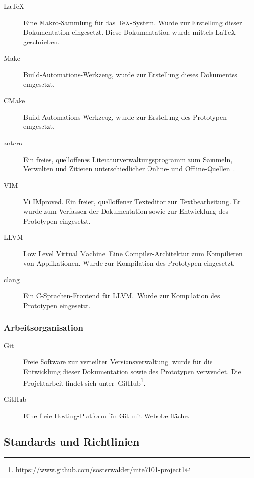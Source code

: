 \begin{description}
    \item[\LaTeX] Eine Makro-Sammlung für das \TeX-System. Wurde zur
        Erstellung dieser Dokumentation eingesetzt. Diese Dokumentation
        wurde mittels \LaTeX{} geschrieben.
    \item[Make] Build-Automations-Werkzeug, wurde zur Erstellung dieses Dokumentes eingesetzt.
    \item[CMake] Build-Automations-Werkzeug, wurde zur Erstellung des
        Prototypen eingesetzt.
    \item[zotero] Ein freies, quelloffenes Literaturverwaltungsprogramm
        zum Sammeln, Verwalten und Zitieren unterschiedlicher Online-
        und Offline-Quellen~\parencite{wikipedia_foundation_zotero_2015}.
    \item[VIM] Vi IMproved. Ein freier, quelloffener Texteditor zur
        Textbearbeitung. Er wurde zum Verfassen der Dokumentation sowie zur
        Entwicklung des Prototypen eingesetzt.
    \item[LLVM] Low Level Virtual Machine. Eine Compiler-Architektur zum
        Kompilieren von Applikationen. Wurde zur Kompilation des
        Prototypen eingesetzt.
    \item[clang] Ein C-Sprachen-Frontend für LLVM.\ Wurde zur Kompilation
        des Prototypen eingesetzt.
\end{description}


\subsubsection{Arbeitsorganisation}
\label{ssubsec:tools_software:job_organisation}

\begin{description}
    \item[Git] Freie Software zur verteilten Versionsverwaltung, wurde
        für die Entwicklung dieser Dokumentation sowie des Prototypen verwendet. Die
        Projektarbeit findet sich
        unter~\href{https://www.github.com/sosterwalder/mte7101-project1}{GitHub}\footnote{
            \href{https://www.github.com/sosterwalder/mte7101-project1}{https://www.github.com/sosterwalder/mte7101-project1}
        }.
    \item[GitHub] Eine freie Hosting-Platform für Git mit Weboberfläche.
\end{description}

\subsection{Standards und Richtlinien}
\label{subsec:standards_guidelines}

